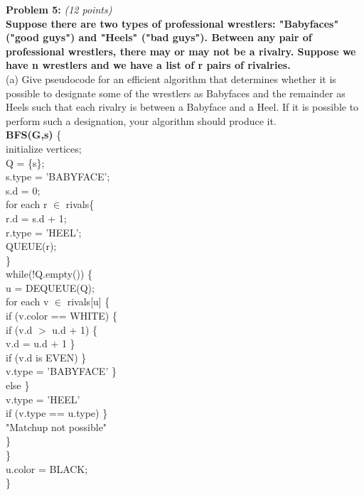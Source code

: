 \documentclass{article}
\begin{document}
\noindent \textbf{Problem 5:} \textit{(12 points)} \\

\noindent \textbf{Suppose there are two types of professional wrestlers: "Babyfaces" ("good guys") and "Heels" ("bad guys"). Between any pair of professional wrestlers, there may or may not be a rivalry. Suppose we have n wrestlers and we have a list of r pairs of rivalries.}
\\[.25cm]

\noindent (a) Give pseudocode for an efficient algorithm that determines whether it is possible to designate some of the wrestlers as Babyfaces and the remainder as Heels such that each rivalry is between a Babyface and a Heel. If it is possible to perform such a designation, your algorithm should produce it.
\\[.25cm]

\textbf{BFS(G,s)} \{ \\
\indent initialize vertices;\\
\indent Q = \{s\};\\
\indent s.type = 'BABYFACE';\\
\indent s.d = 0;\\

\indent for each r $\in$ rivals\{\\
\indent\indent r.d = s.d + 1;\\
\indent\indent r.type = 'HEEL';\\
\indent\indent QUEUE(r);\\
\indent \}\\

\indent while(!Q.empty()) \{ \\
\indent\indent u = DEQUEUE(Q);\\

\indent\indent for each v $\in$ rivals[u] \{ \\ 
\indent\indent\indent if (v.color == WHITE) \{ \\
\indent\indent\indent\indent if (v.d $>$ u.d + 1) \{ \\
\indent\indent\indent\indent\indent v.d = u.d + 1
\indent\indent\indent\indent \} \\
\indent\indent\indent\indent if (v.d is EVEN) \} \\
\indent\indent\indent\indent\indent v.type = 'BABYFACE'
\indent\indent\indent\indent \} \\
\indent\indent\indent\indent else \} \\
\indent\indent\indent\indent\indent v.type = 'HEEL'\\
\indent\indent\indent\indent if (v.type == u.type) \} \\
\indent\indent\indent\indent\indent "Matchup not possible"\\
\indent\indent\indent\indent \} \\
\indent\indent \} \\
\indent\indent u.color = BLACK;\\
\indent \} \\
\end{document}
